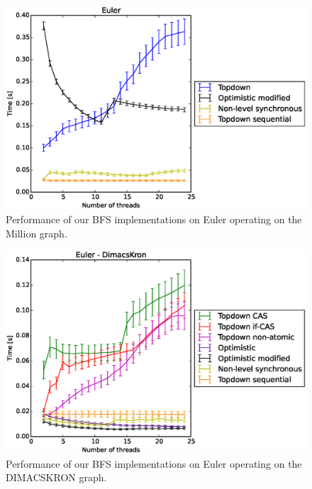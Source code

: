 \documentclass[letterpaper]{article}
\begin{document}
		\begin{figure}\centering
	  		\includegraphics[scale=0.33]{euler_biggraph.eps}
	  		\caption{Performance of our BFS implementations on Euler operating on the Million graph.\label{fig:eulerbig}}
		\end{figure}
		\begin{figure}\centering
	  		\includegraphics[scale=0.33]{euler_dimacskron.eps}
	  		\caption{Performance of our BFS implementations on Euler operating on the DIMACSKRON graph.\label{fig:eulerkron}}
		\end{figure}
\end{document}
